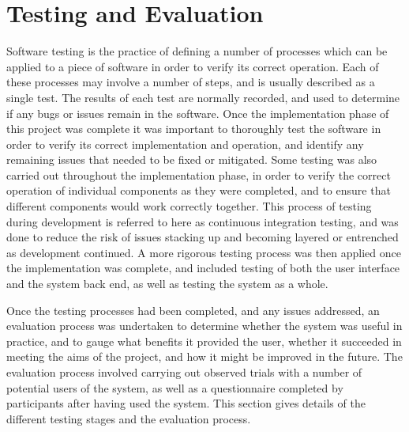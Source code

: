 
\chapter[Testing and Evaluation]{Testing and Evaluation} %

\label{Chapter10} %


Software testing is the practice of defining a number of processes which can be applied to a piece of software in order to verify its correct operation. Each of these processes may involve a number of steps, and is usually described as a single test. The results of each test are normally recorded, and used to determine if any bugs or issues remain in the software. Once the implementation phase of this project was complete it was important to thoroughly test the software in order to verify its correct implementation and operation, and identify any remaining issues that needed to be fixed or mitigated. Some testing was also carried out throughout the implementation phase, in order to verify the correct operation of individual components as they were completed, and to ensure that different components would work correctly together. This process of testing during development is referred to here as continuous integration testing, and was done to reduce the risk of issues stacking up and becoming layered or entrenched as development continued. A more rigorous testing process was then applied once the implementation was complete, and included testing of both the user interface and the system back end, as well as testing the system as a whole. 

Once the testing processes had been completed, and any issues addressed, an evaluation process was undertaken to determine whether the system was useful in practice, and to gauge what benefits it provided the user, whether it succeeded in meeting the aims of the project, and how it might be improved in the future. The evaluation process involved carrying out observed trials with a number of potential users of the system, as well as a questionnaire completed by participants after having used the system. This section gives details of the different testing stages and the evaluation process.


